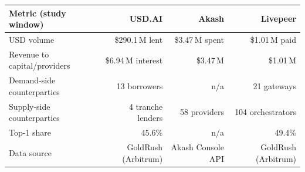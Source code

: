 \begin{tabular}{@{}lrrr@{}}
\toprule
Metric (study window) & USD.AI & Akash & Livepeer \\
\midrule
USD volume & \$290.1\,M lent & \$3.47\,M spent & \$1.01\,M paid \\
Revenue to capital/providers & \$6.94\,M interest & \$3.47\,M & \$1.01\,M \\
Demand-side counterparties & 13 borrowers & n/a & 21 gateways \\
Supply-side counterparties & 4 tranche lenders & 58 providers & 104 orchestrators \\
Top-1 share & 45.6\% & n/a & 49.4\% \\
Data source & GoldRush (Arbitrum) & Akash Console API & GoldRush (Arbitrum) \\
\bottomrule
\end{tabular}
